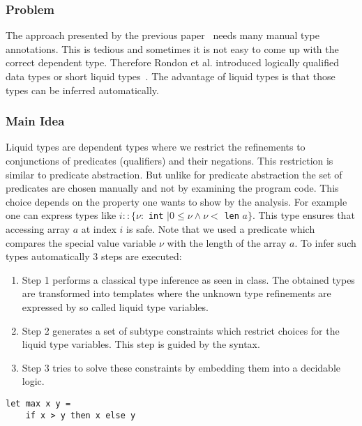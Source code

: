 \documentclass[a4paper,UKenglish]{lipics-v2016}
\begin{document}
\subsubsection{Problem}

The approach presented by the previous paper~\cite{Xi:1998:EAB} needs many manual type annotations.
This is tedious and sometimes it is not easy to come up with the correct dependent type.
Therefore Rondon et al. introduced logically qualified data types or short liquid types~\cite{Rondon:2008:LT}.
The advantage of liquid types is that those types can be inferred automatically.

\subsubsection{Main Idea}

Liquid types are dependent types where we restrict the refinements to conjunctions of predicates (qualifiers) and their negations.
This restriction is similar to predicate abstraction.
But unlike for predicate abstraction the set of predicates are chosen manually and not by examining the program code.
This choice depends on the property one wants to show by the analysis.
For example one can express types like $i:: \{\nu:$ \lstinline{int} $\mid 0 \le \nu \land \nu <$ \lstinline{len} $a\}$.
This type ensures that accessing array $a$ at index $i$ is safe.
Note that we used a predicate which compares the special value variable $\nu$ with the length of the array $a$.
To infer such types automatically 3 steps are executed:\\
\begin{enumerate}
    \item Step 1 performs a classical type inference as seen in class.
        The obtained types are transformed into templates where the unknown type refinements are expressed by so called liquid type variables.
    \item Step 2 generates a set of subtype constraints which restrict choices for the liquid type variables.
        This step is guided by the syntax.
    \item Step 3 tries to solve these constraints by embedding them into a decidable logic.
\end{enumerate}

\begin{lstlisting}[caption={Example Program},label=lst:exmpl,captionpos=t,float,abovecaptionskip=-\medskipamount]
let max x y =
    if x > y then x else y
\end{lstlisting}
\end{document}
